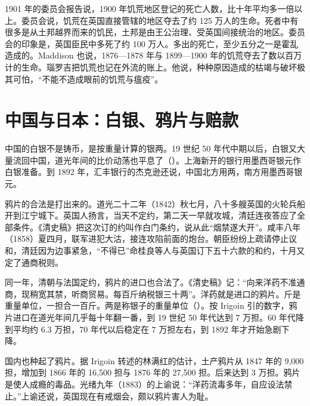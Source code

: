 1901 年的委员会报告说，1900 年饥荒地区登记的死亡人数，比十年平均多一倍以上\cite{famine1901}。委员会说，饥荒在英国直接管辖的地区夺去了约 125 万人的生命\cite{famine1901}。死者中有很多是从土邦越界而来的饥民，土邦是由王公治理、受英国间接统治的地区\cite{famine1901}。委员会的印象是，英国臣民中多死了约 100 万人\cite{famine1901}。多出的死亡，至少五分之一是霍乱造成的\cite{famine1901}。Maddison 也说，1876—1878 年与 1899—1900 年的饥荒夺去了数以百万计的生命\cite{maddison1971}。瑙罗吉把饥荒也记在外流的账上。他说，种种原因造成的枯竭与破坏极其可怕，“不能不造成眼前的饥荒与瘟疫”\cite{naoroji1901}。

\section{中国与日本：白银、鸦片与赔款}\label{sec:periph-china}

中国的白银不是铸币，是按重量计算的银两。19 世纪 50 年代中期以后，白银又大量流回中国，道光年间的比价动荡也平息了（）\cite{atwell2008,irigoin2013}。上海新开的银行用墨西哥银元作白银准备\cite{irigoin2013}。到 1892 年，汇丰银行的杰克逊还说，中国北方用两，南方用墨西哥银元\cite{herschell1893}。

鸦片的合法是打出来的。道光二十二年（1842）秋七月，八十多艘英国的火轮兵船开到江宁城下。英国人扬言，当天不定约，第二天一早就攻城，清廷连夜答应了全部条件\cite{qingshigao}。《清史稿》把这次订的约叫作白门条约，说从此“烟禁遂大开”\cite{qingshigao}。咸丰八年（1858）夏四月，联军进犯大沽，接连攻陷前面的炮台\cite{qingshigao}。朝臣纷纷上疏请停止议和，清廷因为边事紧急，“不得已”命桂良等人与英国订下五十六款的和约，十月又定了通商税则\cite{qingshigao}。

同一年，清朝与法国定约，鸦片的进口也合法了。《清史稿》记：“向来洋药不准通商，现稍宽其禁，听商贸易。每百斤纳税银三十两”\cite{qingshigao}。洋药就是进口的鸦片。斤是重量单位，一担合一百斤。两是称银子的重量单位（）。按 Irigoin 引的数字，鸦片进口在道光年间几乎每十年翻一番，到 19 世纪 50 年代达到 7 万担\cite{irigoin2013}。60 年代降到平均约 6.3 万担，70 年代以后稳定在 7 万担左右，到 1892 年才开始急剧下降\cite{irigoin2013}。

国内也种起了鸦片。据 Irigoin 转述的林满红的估计，土产鸦片从 1847 年的 9,000 担，增加到 1866 年的 16,500 担与 1876 年的 27,500 担\cite{irigoin2013}。后来达到 3 万担\cite{irigoin2013}。鸦片是使人成瘾的毒品。光绪九年（1883）的上谕说：“洋药流毒多年，自应设法禁止。”\cite{qingshigao}上谕还说，英国现在有戒烟会，颇以鸦片害人为耻\cite{qingshigao}。

